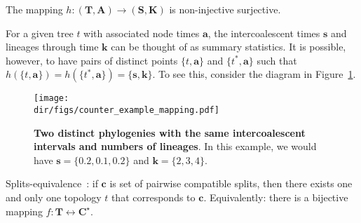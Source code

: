 % 
\begin{remark}
\label{thm:InvarCoal}
  The mapping $h: (\boldsymbol T, \boldsymbol A) \to (\boldsymbol S, \boldsymbol K)$ is non-injective surjective.
\end{remark}
For a given tree  $t$ with associated node times $\boldsymbol a$, the intercoalescent times $\boldsymbol s$ and lineages through time $\boldsymbol k$ can be thought of as summary statistics.
It is possible, however, to have pairs of distinct points $\{t, \boldsymbol a\}$ and $\{t^\ast, \boldsymbol a\}$ such that $h( \{t, \boldsymbol a\}) = h(\{t^\ast, \boldsymbol a\}) = \{\boldsymbol s, \boldsymbol k\}$.
To see this, consider the diagram in Figure~\ref{fig:cexample}.

\begin{figure}[!ht]
  \centering
  \texttt{[image: \\dir/figs/counter\_example\_mapping.pdf]}
\caption[Two distinct phylogenies with the same intercoalescent intervals and numbers of lineages.]{\textbf{Two distinct phylogenies with the same intercoalescent intervals and numbers of lineages}.
In this example, we would have $\boldsymbol s = \{0.2, 0.1, 0.2\}$ and $\boldsymbol k = \{2, 3, 4\}$.
}
\label{fig:cexample}
\end{figure}

\begin{theorem}
\label{thm:splitstheorem}
 Splits-equivalence~\citep{Buneman1971}: if $\boldsymbol c$ is set of pairwise compatible splits, then there exists one and only one topology $t$ that corresponds to $\boldsymbol c$.
 Equivalently: there is a bijective mapping $f: \boldsymbol T  \leftrightarrow \boldsymbol C^\star$.
\end{theorem}


